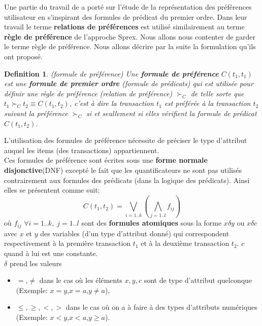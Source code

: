 \documentclass[a4paper,12pt,openany,oneside]{article}
\newtheorem{defn}{Definition} %
\begin{document}
 	Une partie du travail de \cite{CHO} a porté sur l'étude de la représentation des préférences utilisateur en s'inspirant des formules de prédicat du premier ordre. Dans leur travail le terme \textbf{relations de préférences} est utilisé similairement au terme  \textbf{règle de préférence} de l'approche Sprex. Nous allons nous contenter de garder le terme règle de préférence. Nous allons décrire par la suite la formulation qu'ils ont proposé.\\

\begin{defn}(formule de préférence)
	Une  \textbf{formule de préférence} $C(t_{1},t_{1})$ est une \textbf{formule de premier ordre} (formule de prédicats) qui est utilisée pour définir une règle de préférence (relation de préférence) $\succ_{C}$ de telle sorte que $t_{1}\succ_{C} t_{2}\equiv C(t_{1},t_{2})$, c'est à dire la transaction $t_1$ est préférée à la transaction $t_2$ suivant la préférence $\succ_C$ si et seullement si elles vérifient la formule de prédicat $C(t_1,t_2)$.\\
\end{defn}
L'utilisation des formules de préférence nécessite de préciser le type d'attribut auquel les items (des transactions) appartiennent.\\
Ces formules de préférence sont écrites sous une \textbf{forme normale disjonctive}(DNF) excepté le fait que les quantificateurs ne sont pas utilisés contrairement aux formules des prédicats (dans la logique des prédicats). Ainsi elles se présentent comme suit:
 	 \[  
 	 	C(t_{1},t_{2})=\underset{i=1..k}{\bigvee}(\underset{j=1..l}{\bigwedge} f_{ij})
 	 \]
 	  où $f_{ij}$  $\forall i =1..k,\; j=1..l$ sont des \textbf{formules atomiques} sous la forme $x\delta y$ ou $x\delta c$ avec $x$ et $y$ des variables (d'un type d'attribut donné) qui correspondent respectivement à la première transaction $t_{1}$ et à la deuxième transaction $t_{2}$. $c$ quand à lui est une constante.\\
 	  $\delta$ prend les valeurs
\begin{itemize}
\item  $=$,$\neq$ dans le cas où les éléments $x,y,c$ sont de type d'attribut quelconque (Exemple: $x=y$,$x=a$,$y\neq a$),  
\item $\leqslant,\geqslant,<,>$ dans le cas où on a à faire à des types d'attributs numériques (Exemple: $x<y$,$x<a$,$y\geqslant a$).
\end{itemize}
\end{document}
